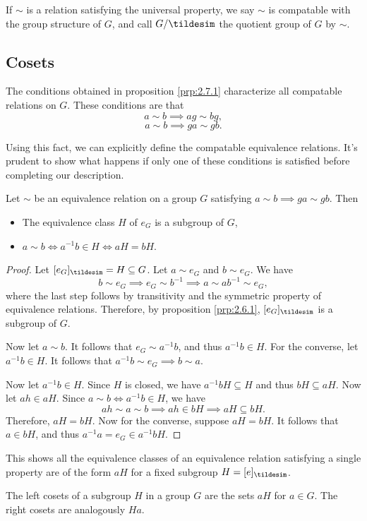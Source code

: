 If $\sim $ is a relation satisfying the universal property, we say $\sim $ is compatable with the group structure of $G$, and call $G /\tildesim $ the quotient group of $G$ by $\sim $.

\subsection{Cosets}
The conditions obtained in proposition \ref{prp:2.7.1} characterize all compatable relations on $G$. These conditions are that
\[
	a\sim b\implies ag\sim bg,
\]
\[
	a\sim b\implies ga\sim gb
.\]

Using this fact, we can explicitly define the compatable equivalence relations. It's prudent to show what happens if only one of these conditions is satisfied before completing our description.
\begin{proposition}\label{prp:2.7.2}
	Let $\sim $ be an equivalence relation on a group $G$ satisfying $a\sim b\implies ga\sim gb$. Then
	\begin{itemize}
		\item The equivalence class $H$ of $e_G$ is a subgroup of $ G$,
		\item $a\sim b \iff a^{-1}b\in H \iff aH=bH$.
	\end{itemize}
\end{proposition}
\begin{proof}
	Let $[e_G]_{\tildesim} =H\subseteq G$. Let $a\sim e_G$ and $b\sim e_G$. We have
	\[
		b\sim e_G \implies e_G \sim b^{-1} \implies a\sim ab^{-1}\sim e_G
	,\]
	where the last step follows by transitivity and the symmetric property of equivalence relations. Therefore, by proposition \ref{prp:2.6.1}, $[e_G]_{\tildesim }$ is a subgroup of $G$.

	Now let $a\sim b$. It follows that $e_G \sim a^{-1}b$, and thus $a^{-1}b\in H$. For the converse, let $a^{-1}b\in H$. It follows that $a^{-1}b\sim e_G \implies b\sim a$.

	Now let $a^{-1}b\in H$. Since $H$ is closed, we have $a^{-1}bH \subseteq H$ and thus $bH\subseteq aH$. Now let $ah\in aH$. Since $a\sim b \iff a^{-1}b\in H$, we have
	\[
		ah \sim a \sim b \implies ah\in bH \implies aH\subseteq bH
	.\]
	Therefore, $aH=bH$. Now for the converse, suppose $aH=bH$. It follows that $a\in bH$, and thus $a^{-1}a=e_G \in a^{-1}bH$.
\end{proof}
This shows all the equivalence classes of an equivalence relation satisfying a single property are of the form $aH$ for a fixed subgroup $H=[e]_{\tildesim }$.
\begin{definition}[Cosets]\label{dfn:2.7.2}
	The left cosets of a  subgroup $H$ in a group $G$ are the sets $aH$ for $a\in G$. The right cosets are analogously $Ha$.
\end{definition}

